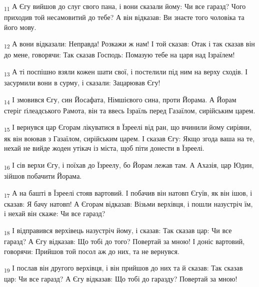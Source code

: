 \begin{tcolorbox}
\textsubscript{11} А Єгу вийшов до слуг свого пана, і вони сказали йому: Чи все гаразд? Чого приходив той несамовитий до тебе? А він відказав: Ви знаєте того чоловіка та його мову.
\end{tcolorbox}
\begin{tcolorbox}
\textsubscript{12} А вони відказали: Неправда! Розкажи ж нам! І той сказав: Отак і так сказав він до мене, говорячи: Так сказав Господь: Помазую тебе на царя над Ізраїлем!
\end{tcolorbox}
\begin{tcolorbox}
\textsubscript{13} А ті поспішно взяли кожен шати свої, і постелили під ним на верху сходів. І засурмили вони в сурму, і сказали: Зацарював Єгу!
\end{tcolorbox}
\begin{tcolorbox}
\textsubscript{14} І змовився Єгу, син Йосафата, Німшієвого сина, проти Йорама. А Йорам стеріг ґілеадського Рамота, він та ввесь Ізраїль перед Газаїлом, сирійським царем.
\end{tcolorbox}
\begin{tcolorbox}
\textsubscript{15} І вернувся цар Єгорам лікуватися в Їзреелі від ран, що вчинили йому сиріяни, як він воював з Газаїлом, сирійським царем. І сказав Єгу: Якщо згода ваша на те, нехай не вийде жоден утікач із міста, щоб піти донести в Їзреелі.
\end{tcolorbox}
\begin{tcolorbox}
\textsubscript{16} І сів верхи Єгу, і поїхав до Їзреелу, бо Йорам лежав там. А Ахазія, цар Юдин, зійшов побачити Йорама.
\end{tcolorbox}
\begin{tcolorbox}
\textsubscript{17} А на башті в Їзреелі стояв вартовий. І побачив він натовп Єгуїв, як він ішов, і сказав: Я бачу натовп! А Єгорам відказав: Візьми верхівця, і пошли назустріч їм, і нехай він скаже: Чи все гаразд?
\end{tcolorbox}
\begin{tcolorbox}
\textsubscript{18} І відправився верхівець назустріч йому, і сказав: Так сказав цар: Чи все гаразд? А Єгу відказав: Що тобі до того? Повертай за мною! І доніс вартовий, говорячи: Прийшов той посол аж до них, та не вернувся.
\end{tcolorbox}
\begin{tcolorbox}
\textsubscript{19} І послав він другого верхівця, і він прийшов до них та й сказав: Так сказав цар: Чи все гаразд? А Єгу відказав: Що тобі до гаразду? Повертай за мною!
\end{tcolorbox}
